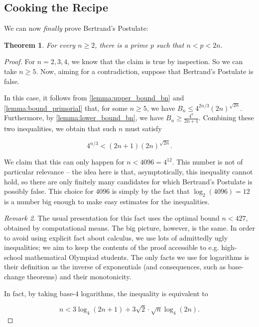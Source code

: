 \documentclass[11pt]{article}
\newtheorem{theorem}{Theorem}[section]
\theoremstyle{remark}
\newtheorem{remark}[theorem]{Remark}
\newcommand{\vs}{\vspace{10px}}
\begin{document}
\subsection{Cooking the Recipe}

We can now \textit{finally} prove Bertrand's Postulate:

\begin{theorem}
    For every $n\ge 2$, there is a prime $p$ such that $n<p<2n$.
\end{theorem}
\vs

\begin{proof}
    For $n =2, 3, 4$, we know that the claim is true by inspection. So we can take $n\ge 5$. Now, aiming for a contradiction, suppose that Bertrand's Postulate is false.

    In this case, it follows from \ref{lemma:upper_bound_bn} and \ref{lemma:bound_primorial} that, for some $n\ge 5$, we have $B_n\le4^{2n/3}(2n)^{\sqrt{2n}}$. Furthermore, by \ref{lemma:lower_bound_bn}, we have $B_n\ge \frac{4^n}{2n+1}$. Combining these two inequalities, we obtain that such $n$ must satisfy
    
    \[
    4^{n/3}
    <
    (2n+1)(2n)^{\sqrt{2n}}.
    \]

    We claim that this can only happen for $n< 4096=4^{12}$. This number is not of particular relevance -- the idea here is that, asymptotically, this inequality cannot hold, so there are only finitely many candidates for which Bertrand's Postulate is possibly false. This choice for $4096$ is simply by the fact that $\log_2(4096)=12$ is a number big enough to make easy estimates for the inequalities.
    
    \begin{remark}
    The usual presentation for this fact uses the optimal bound $n<427$, obtained by computational means. The big picture, however, is the same. In order to avoid using explicit fact about calculus, we use lots of admittedly ugly inequalities; we aim to keep the contents of the proof accessible to e.g. high-school mathematical Olympiad students. The only facts we use for logarithms is their definition as the inverse of exponentials (and consequences, such as base-change theorems) and their monotonicity.
    \end{remark}
    \vs
    
    In fact, by taking base-4 logarithms, the inequality is equivalent to  

    \[n < 3\log_4(2n+1)+3\sqrt{2}\cdot\sqrt{n}\log_4(2n).\]


\end{proof}
\end{document}
